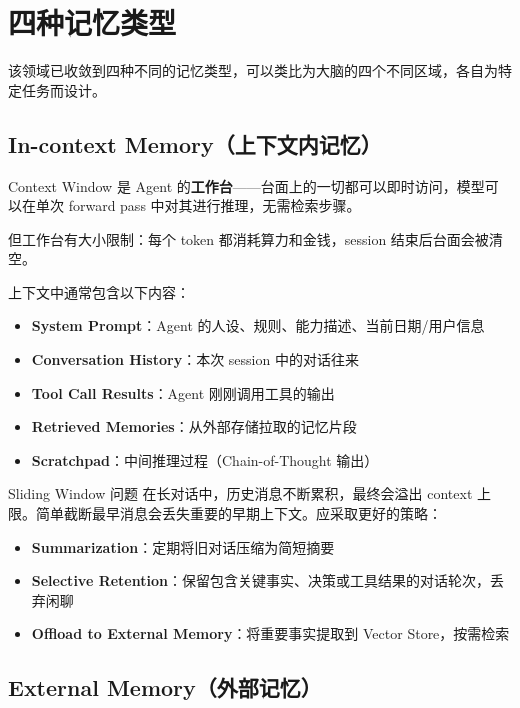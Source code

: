 \section{四种记忆类型}

该领域已收敛到四种不同的记忆类型，可以类比为大脑的四个不同区域，各自为特定任务而设计。

\subsection{In-context Memory（上下文内记忆）}

Context Window 是 Agent 的\textbf{工作台}——台面上的一切都可以即时访问，模型可以在单次 forward pass 中对其进行推理，无需检索步骤。

但工作台有大小限制：每个 token 都消耗算力和金钱，session 结束后台面会被清空。

上下文中通常包含以下内容：
\begin{itemize}[leftmargin=2em]
    \item \textbf{System Prompt}：Agent 的人设、规则、能力描述、当前日期/用户信息
    \item \textbf{Conversation History}：本次 session 中的对话往来
    \item \textbf{Tool Call Results}：Agent 刚刚调用工具的输出
    \item \textbf{Retrieved Memories}：从外部存储拉取的记忆片段
    \item \textbf{Scratchpad}：中间推理过程（Chain-of-Thought 输出）
\end{itemize}

\begin{warningbox}{Sliding Window 问题}
在长对话中，历史消息不断累积，最终会溢出 context 上限。简单截断最早消息会丢失重要的早期上下文。应采取更好的策略：
\begin{itemize}[leftmargin=1.5em]
    \item \textbf{Summarization}：定期将旧对话压缩为简短摘要
    \item \textbf{Selective Retention}：保留包含关键事实、决策或工具结果的对话轮次，丢弃闲聊
    \item \textbf{Offload to External Memory}：将重要事实提取到 Vector Store，按需检索
\end{itemize}
\end{warningbox}

\subsection{External Memory（外部记忆）}

